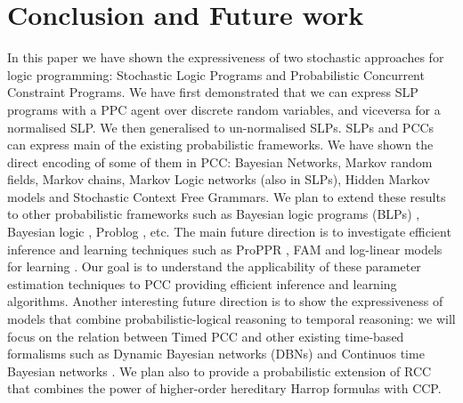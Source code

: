 \documentclass[letterpaper]{article}
\theoremstyle{plain}
\theoremstyle{definition}
\theoremstyle{remark}
\theoremstyle{definition}
\begin{document}
\section{Conclusion and Future work}
In this paper we have shown the expressiveness of two stochastic approaches for logic programming: Stochastic Logic Programs and Probabilistic Concurrent Constraint Programs.
We have first demonstrated that we can express SLP programs with a PPC agent over discrete random variables, and viceversa for a normalised SLP. We then generalised to un-normalised SLPs.
SLPs and PCCs can express main of the existing probabilistic frameworks. We have shown the direct encoding of some of them in PCC: Bayesian Networks, Markov random fields, Markov chains, Markov Logic networks (also in SLPs), Hidden Markov models and Stochastic Context Free Grammars.
We plan to extend these results to other probabilistic frameworks such as Bayesian logic programs (BLPs)  \cite{LogicBN,LogicBN_1}, Bayesian logic \cite{BLOG}, Problog \cite{ProbLog_original}, etc.
The main future direction is to investigate efficient inference and learning techniques such as ProPPR \cite{proppr_article,proppr_summary,proppr_journal}, FAM \cite{SLPcussens2001} and log-linear models for learning \cite{cussens_1999}. Our goal is to understand the applicability of these parameter estimation techniques to PCC providing efficient inference and learning algorithms.
Another interesting future direction is to show the expressiveness of models that combine probabilistic-logical reasoning  to temporal reasoning: we will focus on the relation between Timed PCC \cite{PCC} and other existing time-based formalisms such as Dynamic Bayesian networks (DBNs) \cite{dynamicBN} and Continuos time Bayesian networks \cite{timeBN}.
We plan also to provide a probabilistic extension of  RCC \cite{RCC} that combines the power of higher-order hereditary Harrop formulas with CCP.


\newpage
 

\end{document}
